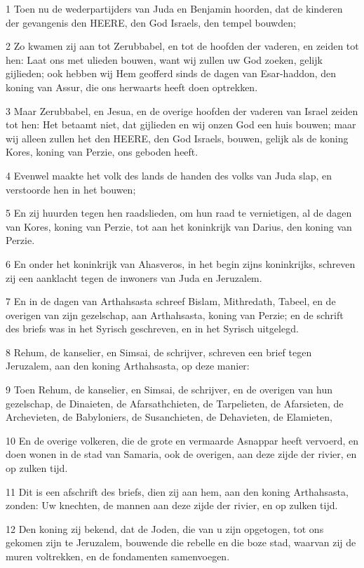 \par 1 Toen nu de wederpartijders van Juda en Benjamin hoorden, dat de kinderen der gevangenis den HEERE, den God Israels, den tempel bouwden;
\par 2 Zo kwamen zij aan tot Zerubbabel, en tot de hoofden der vaderen, en zeiden tot hen: Laat ons met ulieden bouwen, want wij zullen uw God zoeken, gelijk gijlieden; ook hebben wij Hem geofferd sinds de dagen van Esar-haddon, den koning van Assur, die ons herwaarts heeft doen optrekken.
\par 3 Maar Zerubbabel, en Jesua, en de overige hoofden der vaderen van Israel zeiden tot hen: Het betaamt niet, dat gijlieden en wij onzen God een huis bouwen; maar wij alleen zullen het den HEERE, den God Israels, bouwen, gelijk als de koning Kores, koning van Perzie, ons geboden heeft.
\par 4 Evenwel maakte het volk des lands de handen des volks van Juda slap, en verstoorde hen in het bouwen;
\par 5 En zij huurden tegen hen raadslieden, om hun raad te vernietigen, al de dagen van Kores, koning van Perzie, tot aan het koninkrijk van Darius, den koning van Perzie.
\par 6 En onder het koninkrijk van Ahasveros, in het begin zijns koninkrijks, schreven zij een aanklacht tegen de inwoners van Juda en Jeruzalem.
\par 7 En in de dagen van Arthahsasta schreef Bislam, Mithredath, Tabeel, en de overigen van zijn gezelschap, aan Arthahsasta, koning van Perzie; en de schrift des briefs was in het Syrisch geschreven, en in het Syrisch uitgelegd.
\par 8 Rehum, de kanselier, en Simsai, de schrijver, schreven een brief tegen Jeruzalem, aan den koning Arthahsasta, op deze manier:
\par 9 Toen Rehum, de kanselier, en Simsai, de schrijver, en de overigen van hun gezelschap, de Dinaieten, de Afarsathchieten, de Tarpelieten, de Afarsieten, de Archevieten, de Babyloniers, de Susanchieten, de Dehavieten, de Elamieten,
\par 10 En de overige volkeren, die de grote en vermaarde Asnappar heeft vervoerd, en doen wonen in de stad van Samaria, ook de overigen, aan deze zijde der rivier, en op zulken tijd.
\par 11 Dit is een afschrift des briefs, dien zij aan hem, aan den koning Arthahsasta, zonden: Uw knechten, de mannen aan deze zijde der rivier, en op zulken tijd.
\par 12 Den koning zij bekend, dat de Joden, die van u zijn opgetogen, tot ons gekomen zijn te Jeruzalem, bouwende die rebelle en die boze stad, waarvan zij de muren voltrekken, en de fondamenten samenvoegen.
